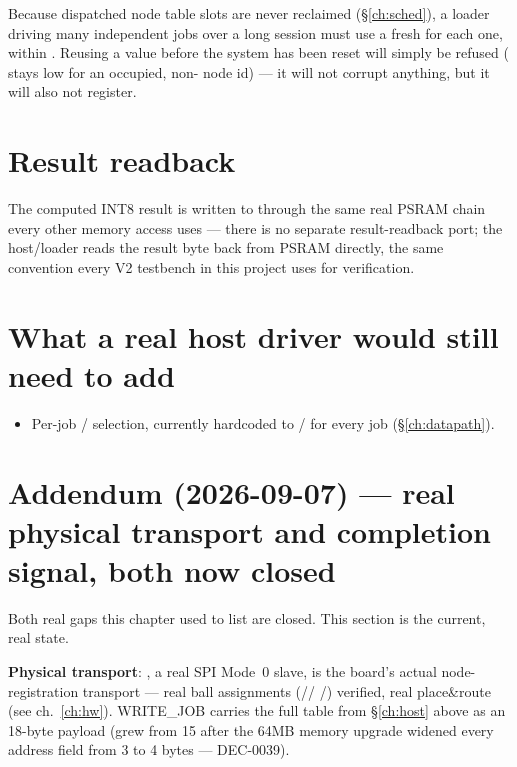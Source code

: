 \begin{fnnote}
Because dispatched node table slots are never reclaimed
(\S\ref{ch:sched}), a loader driving many independent jobs over a long
session must use a fresh  for each one, within
. Reusing a value before the system has been reset will
simply be refused ( stays low for an occupied,
non- node id) --- it will not corrupt anything, but it will
also not register.
\end{fnnote}

\section{Result readback}
The computed INT8 result is written to  through
the same real PSRAM chain every other memory access uses --- there is no
separate result-readback port; the host/loader reads the result byte
back from PSRAM directly, the same convention every V2 testbench in this
project uses for verification.

\section{What a real host driver would still need to add}
\begin{itemize}
\item Per-job / selection, currently
      hardcoded to / for every job
      (\S\ref{ch:datapath}).
\end{itemize}

\section{Addendum (2026-09-07) --- real physical transport and
completion signal, both now closed}
\label{sec:host-addendum}
\begin{fnwarn}
Both real gaps this chapter used to list are closed. This section is
the current, real state.
\end{fnwarn}

\textbf{Physical transport}: , a real SPI
Mode~0 slave, is the board's actual node-registration transport ---
real ball assignments (//
/) verified, real place\&route (see
ch.~\ref{ch:hw}). WRITE\_JOB carries the full table from
\S\ref{ch:host} above as an 18-byte payload (grew from 15 after the
64MB memory upgrade widened every address field from 3 to 4 bytes ---
 DEC-0039).

